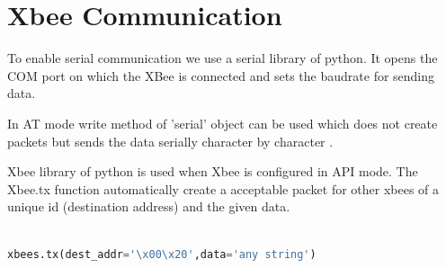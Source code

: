 \documentclass[main.tex]{subfiles}
\begin{document}
\section{Xbee Communication}
To enable serial communication we use a serial library of python.
It opens the COM port on which the XBee is connected and sets the baudrate for sending data.

In AT mode write method of 'serial' object can be used which does not create packets but sends the data serially character by character .


Xbee library of python is used when Xbee is configured in API mode.
The Xbee.tx function automatically create a acceptable packet for other xbees of a unique id (destination address) and the given data.
\begin{lstlisting}[language=Python, caption =Xbee API mode packet generation]

xbees.tx(dest_addr='\x00\x20',data='any string')

\end{lstlisting}





\pagebreak	
\end{document}
